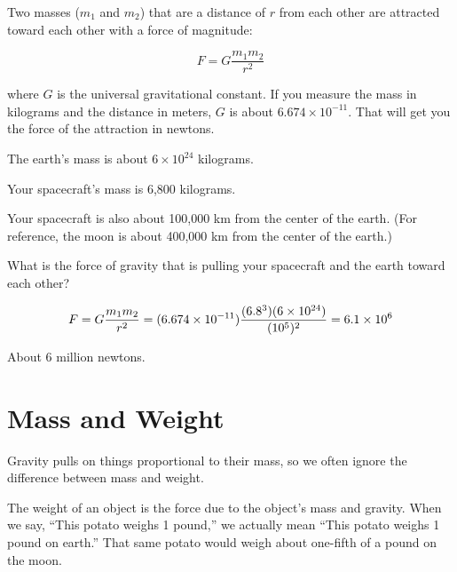 \begin{mdframed}[style=important, frametitle={Newton's Law of Universal Gravitation}]

Two masses ($m_1$ and $m_2$) that are a distance of
$r$ from each other are attracted toward each other with a force of
magnitude:

$$F = G\frac{m_1 m_2}{r^2}$$

where $G$ is the universal gravitational constant. If you measure the
mass in kilograms and the distance in meters, $G$ is about $6.674
\times 10^{-11}$. That will get you the force of the attraction in
newtons.

\end{mdframed}

\begin{Exercise}[title={Gravity}, label=gravity_earth]

  The earth's mass is about $6 \times 10^{24}$ kilograms.

  Your spacecraft's mass is 6,800 kilograms.

  Your spacecraft is also about 100,000 km from the center of the earth. (For reference, the moon is about 400,000 km from the center of the earth.)

  What is the force of gravity that is pulling your spacecraft and the earth toward each other?

\end{Exercise}
\begin{Answer}[ref=gravity_earth]

  $$F = G\frac{m_1 m_2}{r^2} = (6.674 \times 10^{-11})\frac{(6.8 \time 10^3)(6 \times 10^{24})}{(10^5)^2} = 6.1 \times 10^{6}$$

  About 6 million newtons.

\end{Answer}

\section{Mass and Weight}

Gravity pulls on things proportional to their mass, so we often
ignore the difference between mass and weight.

The weight of an object is the force due to the object's mass and
gravity. When we say, ``This potato weighs 1 pound,'' we actually mean
``This potato weighs 1 pound on earth.'' That same potato would weigh
about one-fifth of a pound on the moon.

